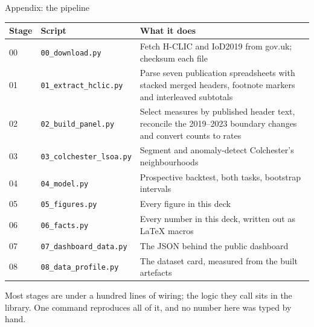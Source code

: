 \documentclass[aspectratio=169,11pt]{beamer}
\newcommand{\smallcap}[1]{{\footnotesize\color{inktwo}#1}}
\begin{document}
\begin{frame}{Appendix: the pipeline}
  \scriptsize
  \begin{tabular}{@{}ll>{\raggedright\arraybackslash}p{}@{}}
    \toprule
    \textbf{Stage} & \textbf{Script} & \textbf{What it does} \\
    \midrule
    00 & \texttt{00\_download.py}      & Fetch H-CLIC and IoD2019 from gov.uk; checksum each file \\
    01 & \texttt{01\_extract\_hclic.py} & Parse seven publication spreadsheets with stacked merged headers, footnote markers and interleaved subtotals \\
    02 & \texttt{02\_build\_panel.py}   & Select measures by published header text, reconcile the 2019--2023 boundary changes and convert counts to rates \\
    03 & \texttt{03\_colchester\_lsoa.py} & Segment and anomaly-detect Colchester's neighbourhoods \\
    04 & \texttt{04\_model.py}          & Prospective backtest, both tasks, bootstrap intervals \\
    05 & \texttt{05\_figures.py}        & Every figure in this deck \\
    06 & \texttt{06\_facts.py}          & Every number in this deck, written out as \LaTeX{} macros \\
    07 & \texttt{07\_dashboard\_data.py} & The JSON behind the public dashboard \\
    08 & \texttt{08\_data\_profile.py}  & The dataset card, measured from the built artefacts \\
    \bottomrule
  \end{tabular}

  \smallcap{Most stages are under a hundred lines of wiring; the logic they
  call sits in the library. One command reproduces all of it, and no number
  here was typed by hand.}
\end{frame}
\end{document}
